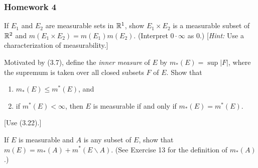 \subsubsection{Homework 4}

\begin{problem}
  If $E_1$ and $E_2$ are measurable sets in $\mathbb{R}^1$, show $E_1\times E_2$
  is a measurable subset of $\mathbb{R}^2$ and $m(E_1\times
  E_2)=m(E_1)m(E_2)$. (Interpret $0\cdot\infty$ as $0$.) [\emph{Hint:} Use
  a characterization of measurability.]
\end{problem}
\begin{solution}
\end{solution}

\begin{problem}
  Motivated by (3.7), define the \emph{inner measure} of $E$ by
  $m_*(E)=\sup|F|$, where the supremum is taken over all closed subsets $F$
  of $E$. Show that
\begin{enumerate}[label=(\roman*),noitemsep]
\item $m_*(E)\leq m^*(E)$, and
\item if $m^*(E)<\infty$, then $E$ is measurable if and only if
  $m_*(E)=m^*(E)$.
\end{enumerate}
[Use (3.22).]
\end{problem}
\begin{solution}
\end{solution}

\begin{problem}
  If $E$ is measurable and $A$ is any subset of $E$, show that
  $m(E)=m_*(A)+m^*(E\smallsetminus A)$. (See Exercise 13 for the definition
  of $m_*(A)$.)
\end{problem}
\begin{solution}
\end{solution}

